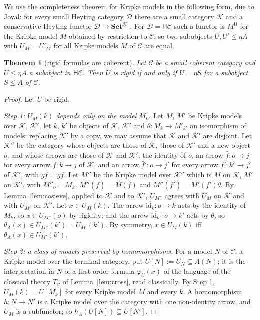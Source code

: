 \documentclass[11pt]{amsart}
\newtheorem{thm}{Theorem}[section]
\theoremstyle{definition}
\newcommand{\Set}{\mathbf{Set}}
\newcommand{\HH}{\mathsf H}
\newcommand{\cC}{\mathcal C}
\newcommand{\cD}{\mathcal D}
\newcommand{\cK}{\mathcal K}
\begin{document}
We use the completeness theorem for Kripke models in the following
form, due to Joyal: for every small Heyting category $\cD$ there are a
small category $\cK$ and a conservative Heyting functor
$\cD\to\Set^{\cK}$ \cite{MR95}. For $\cD=\HH\cC$ such a functor is
$M^{\HH}$ for the Kripke model $M$ obtained by restriction to $\cC$; so
two subobjects $U,U'\le\eta A$ with $U_M=U'_M$ for all Kripke models
$M$ of $\cC$ are equal.

\begin{thm}[rigid formulas are coherent]\label{thm:rigid}
Let $\cC$ be a small coherent category and $U\le\eta A$ a subobject in
$\HH\cC$. Then $U$ is rigid if and only if $U=\eta S$ for a subobject
$S\le A$ of $\cC$.
\end{thm}
\begin{proof}
Let $U$ be rigid.

\emph{Step 1: $U_M(k)$ depends only on the model $M_k$.} Let $M$, $M'$
be Kripke models over $\cK$, $\cK'$, let $k$, $k'$ be objects of
$\cK$, $\cK'$ and $\theta\colon M_k\to M'_{k'}$ an isomorphism of
models; replacing $\cK'$ by a copy, we may assume that $\cK$ and
$\cK'$ are disjoint. Let $\cK''$ be the category whose objects are those of $\cK$,
those of $\cK'$ and a new object $o$, and whose arrows are those of
$\cK$ and $\cK'$, the identity of $o$, an arrow $\bar f\colon o\to j$
for every arrow $f\colon k\to j$ of $\cK$, and an arrow $\bar f'\colon
o\to j'$ for every arrow $f'\colon k'\to j'$ of $\cK'$, with
$g\bar f=\overline{gf}$. Let $M''$ be the Kripke model over $\cK''$
which is $M$ on $\cK$, $M'$ on $\cK'$, with $M''_o=M_k$,
$M''(\bar f)=M(f)$ and $M''(\bar f')=M'(f')\theta$. By
Lemma~\ref{lem:cosieve}, applied to $\cK$ and to $\cK'$, $U_{M''}$
agrees with $U_M$ on $\cK$ and with $U_{M'}$ on $\cK'$. Let $x\in
U_M(k)$. The arrow $\overline{\mathrm{id}_k}\colon o\to k$ acts by the
identity of $M_k$, so $x\in U_{M''}(o)$ by rigidity; and the arrow
$\overline{\mathrm{id}_{k'}}\colon o\to k'$ acts by $\theta$, so
$\theta_A(x)\in U_{M''}(k')=U_{M'}(k')$. By symmetry, $x\in U_M(k)$ iff
$\theta_A(x)\in U_{M'}(k')$.

\emph{Step 2: a class of models preserved by homomorphisms.} For a
model $N$ of $\cC$, a Kripke model over the terminal category, put
$U[N]:=U_N\subseteq A(N)$; it is the interpretation in $N$ of a
first-order formula $\varphi_U(x)$ of the language of the classical
theory $T_\cC$ of Lemma~\ref{lem:cross}, read classically. By Step 1,
$U_M(k)=U[M_k]$ for every Kripke model $M$ and every $k$. A
homomorphism $h\colon N\to N'$ is a Kripke model over the category
with one non-identity arrow, and $U_M$ is a subfunctor; so $h_A(U[N])
\subseteq U[N']$.


\end{proof}
\end{document}
